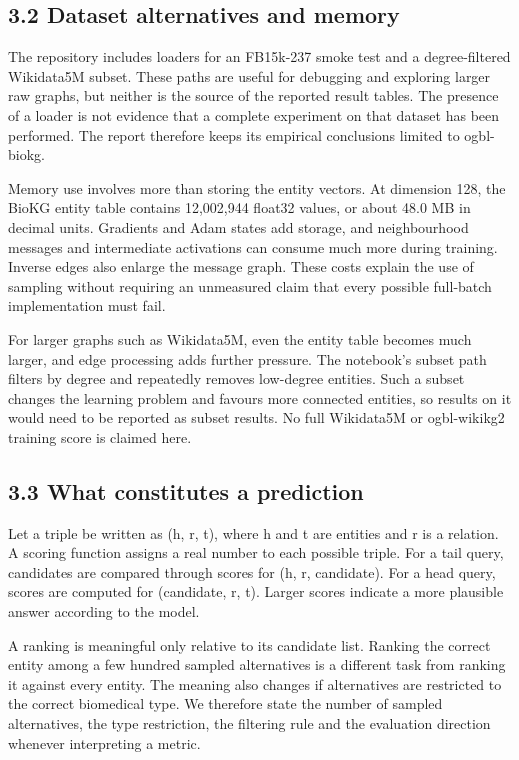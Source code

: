 \documentclass[11pt]{article}
\begin{document}
\subsection*{3.2 Dataset alternatives and memory}
The repository includes loaders for an FB15k-237 smoke test and a degree-filtered Wikidata5M subset. These paths are useful for debugging and exploring larger raw graphs, but neither is the source of the reported result tables. The presence of a loader is not evidence that a complete experiment on that dataset has been performed. The report therefore keeps its empirical conclusions limited to ogbl-biokg.

Memory use involves more than storing the entity vectors. At dimension 128, the BioKG entity table contains 12,002,944 float32 values, or about 48.0 MB in decimal units. Gradients and Adam states add storage, and neighbourhood messages and intermediate activations can consume much more during training. Inverse edges also enlarge the message graph. These costs explain the use of sampling without requiring an unmeasured claim that every possible full-batch implementation must fail.

For larger graphs such as Wikidata5M, even the entity table becomes much larger, and edge processing adds further pressure. The notebook's subset path filters by degree and repeatedly removes low-degree entities. Such a subset changes the learning problem and favours more connected entities, so results on it would need to be reported as subset results. No full Wikidata5M or ogbl-wikikg2 training score is claimed here.

\subsection*{3.3 What constitutes a prediction}
Let a triple be written as (h, r, t), where h and t are entities and r is a relation. A scoring function assigns a real number to each possible triple. For a tail query, candidates are compared through scores for (h, r, candidate). For a head query, scores are computed for (candidate, r, t). Larger scores indicate a more plausible answer according to the model.

A ranking is meaningful only relative to its candidate list. Ranking the correct entity among a few hundred sampled alternatives is a different task from ranking it against every entity. The meaning also changes if alternatives are restricted to the correct biomedical type. We therefore state the number of sampled alternatives, the type restriction, the filtering rule and the evaluation direction whenever interpreting a metric.
\end{document}
